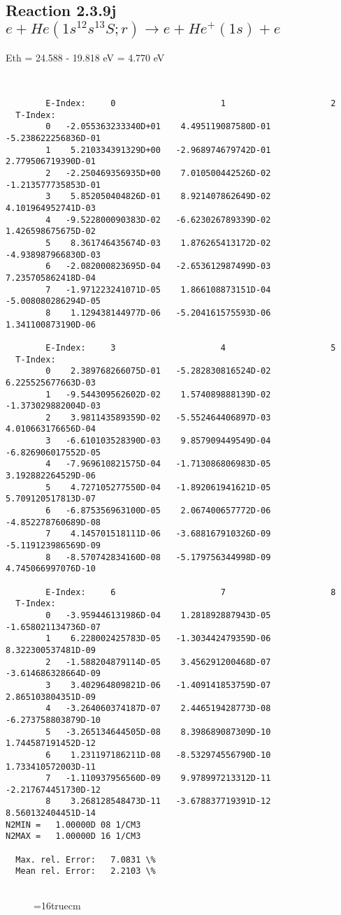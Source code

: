 \documentclass[12pt,dvipdfmx]{article}
\begin{document}
\subsection{
Reaction 2.3.9j  $e + He(1s^12s^13S;r) \rightarrow e + He^+(1s) + e $
}
Eth = 24.588 - 19.818 eV = 4.770 eV


\begin{small}\begin{verbatim}


        E-Index:     0                     1                     2
  T-Index:
        0   -2.055363233340D+01    4.495119087580D-01   -5.238622256836D-01
        1    5.210334391329D+00   -2.968974679742D-01    2.779506719390D-01
        2   -2.250469356935D+00    7.010500442526D-02   -1.213577735853D-01
        3    5.852050404826D-01    8.921407862649D-02    4.101964952741D-03
        4   -9.522800090383D-02   -6.623026789339D-02    1.426598675675D-02
        5    8.361746435674D-03    1.876265413172D-02   -4.938987966830D-03
        6   -2.082000823695D-04   -2.653612987499D-03    7.235705862418D-04
        7   -1.971223241071D-05    1.866108873151D-04   -5.008080286294D-05
        8    1.129438144977D-06   -5.204161575593D-06    1.341100873190D-06

        E-Index:     3                     4                     5
  T-Index:
        0    2.389768266075D-01   -5.282830816524D-02    6.225525677663D-03
        1   -9.544309562602D-02    1.574089888139D-02   -1.373029882004D-03
        2    3.981143589359D-02   -5.552464406897D-03    4.010663176656D-04
        3   -6.610103528390D-03    9.857909449549D-04   -6.826906017552D-05
        4   -7.969610821575D-04   -1.713086806983D-05    3.192882264529D-06
        5    4.727105277550D-04   -1.892061941621D-05    5.709120517813D-07
        6   -6.875356963100D-05    2.067400657772D-06   -4.852278760689D-08
        7    4.145701518111D-06   -3.688167910326D-09   -5.119123986569D-09
        8   -8.570742834160D-08   -5.179756344998D-09    4.745066997076D-10

        E-Index:     6                     7                     8
  T-Index:
        0   -3.959446131986D-04    1.281892887943D-05   -1.658021134736D-07
        1    6.228002425783D-05   -1.303442479359D-06    8.322300537481D-09
        2   -1.588204879114D-05    3.456291200468D-07   -3.614686328664D-09
        3    3.402964809821D-06   -1.409141853759D-07    2.865103804351D-09
        4   -3.264060374187D-07    2.446519428773D-08   -6.273758803879D-10
        5   -3.265134644505D-08    8.398689087309D-10    1.744587191452D-12
        6    1.231197186211D-08   -8.532974556790D-10    1.733410572003D-11
        7   -1.110937956560D-09    9.978997213312D-11   -2.217674451730D-12
        8    3.268128548473D-11   -3.678837719391D-12    8.560132404451D-14
N2MIN =   1.00000D 08 1/CM3
N2MAX =   1.00000D 16 1/CM3

  Max. rel. Error:   7.0831 \%
  Mean rel. Error:   2.2103 \%


\end{verbatim}\end{small}
\begin{figure} \label{2.3.9j}
\epsfxsize=16truecm
\end{figure}
\newpage
\end{document}
